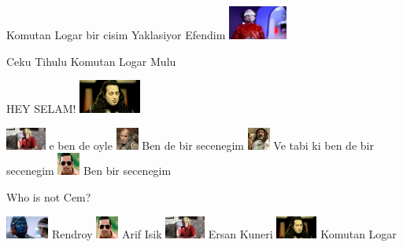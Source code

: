 \documentclass{exam}
\begin{document}
\begin{questions}
\begin{oneparchoices}
\end{oneparchoices}
\question Komutan Logar bir cisim Yaklasiyor Efendim\newline
\includegraphics[height=3em]{tihulu.jpeg} \newline
\begin{oneparchoices}
\choice Ceku
\choice Tihulu
\choice Komutan Logar
\choice Mulu
\end{oneparchoices}
\question HEY SELAM!\newline
\includegraphics[height=3em]{komutanlogar.jpeg} \newline
\begin{oneparchoices}
\choice \includegraphics[height=2em]{ersan.jpg}
e ben de oyle
\choice \includegraphics[height=2em]{216.jpg}
Ben de bir secenegim
\choice \includegraphics[height=2em]{faruk.jpg}
Ve tabi ki ben de bir secenegim
\choice \includegraphics[height=2em]{arifisik.jpg}
Ben bir secenegim
\end{oneparchoices}
\question Who is not Cem?\newline
\begin{oneparchoices}
\choice \includegraphics[height=2em]{rendroy2.jpg}
Rendroy
\choice \includegraphics[height=2em]{arifisik.jpg}
Arif Isik
\choice \includegraphics[height=2em]{ersan.jpg}
Ersan Kuneri
\choice \includegraphics[height=2em]{komutanlogar.jpeg}
Komutan Logar
\end{oneparchoices}
\end{questions}
\end{document}
